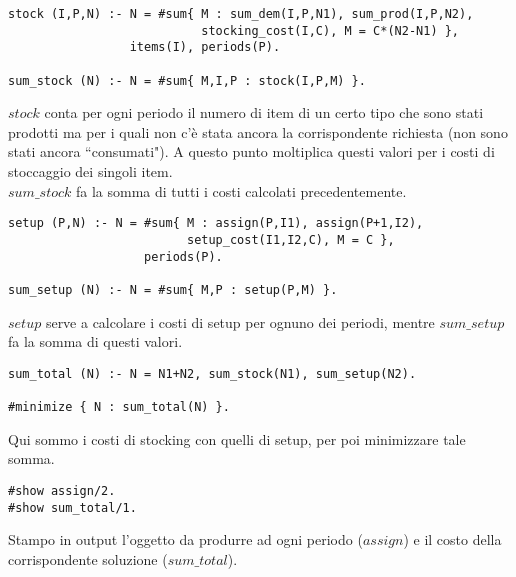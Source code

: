\documentclass[12pt]{article}
\begin{document}
\begin{verbatim}
stock (I,P,N) :- N = #sum{ M : sum_dem(I,P,N1), sum_prod(I,P,N2),
                           stocking_cost(I,C), M = C*(N2-N1) },
                 items(I), periods(P).

sum_stock (N) :- N = #sum{ M,I,P : stock(I,P,M) }.
\end{verbatim}
$stock$ conta per ogni periodo il numero di item di un certo tipo che sono stati prodotti ma per i quali non c'è stata ancora la corrispondente richiesta (non sono stati ancora ``consumati"). A questo punto moltiplica questi valori per i costi di stoccaggio dei singoli item.\\
$sum\_stock$ fa la somma di tutti i costi calcolati precedentemente.

\begin{verbatim}
setup (P,N) :- N = #sum{ M : assign(P,I1), assign(P+1,I2),
                         setup_cost(I1,I2,C), M = C },
                   periods(P).

sum_setup (N) :- N = #sum{ M,P : setup(P,M) }.
\end{verbatim}
$setup$ serve a calcolare i costi di setup per ognuno dei periodi, mentre $sum\_setup$ fa la somma di questi valori.
\pagebreak

\begin{verbatim}
sum_total (N) :- N = N1+N2, sum_stock(N1), sum_setup(N2).

#minimize { N : sum_total(N) }.
\end{verbatim}
Qui sommo i costi di stocking con quelli di setup, per poi minimizzare tale somma.

\begin{verbatim}
#show assign/2.
#show sum_total/1.
\end{verbatim}
Stampo in output l'oggetto da produrre ad ogni periodo ($assign$) e il costo della corrispondente soluzione ($sum\_total$).
\pagebreak
\end{document}
